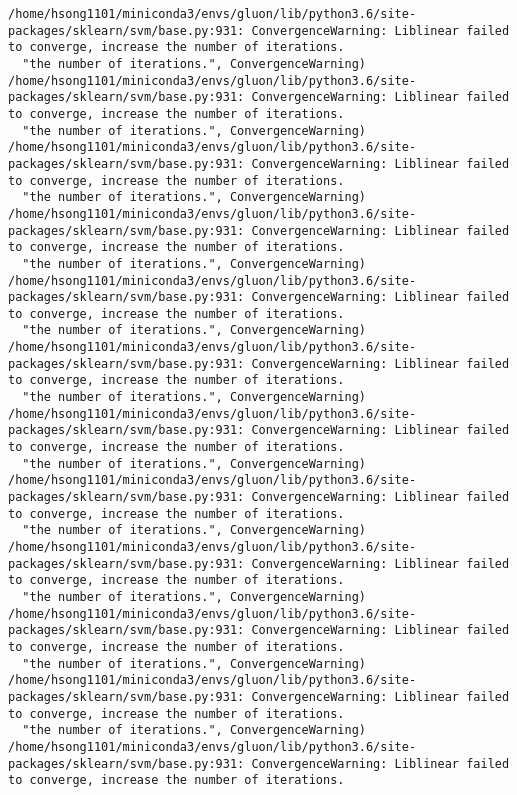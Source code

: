 \documentclass[11pt]{article}
\begin{document}
\begin{Verbatim}[commandchars=\\\{\}]
/home/hsong1101/miniconda3/envs/gluon/lib/python3.6/site-packages/sklearn/svm/base.py:931: ConvergenceWarning: Liblinear failed to converge, increase the number of iterations.
  "the number of iterations.", ConvergenceWarning)
/home/hsong1101/miniconda3/envs/gluon/lib/python3.6/site-packages/sklearn/svm/base.py:931: ConvergenceWarning: Liblinear failed to converge, increase the number of iterations.
  "the number of iterations.", ConvergenceWarning)
/home/hsong1101/miniconda3/envs/gluon/lib/python3.6/site-packages/sklearn/svm/base.py:931: ConvergenceWarning: Liblinear failed to converge, increase the number of iterations.
  "the number of iterations.", ConvergenceWarning)
/home/hsong1101/miniconda3/envs/gluon/lib/python3.6/site-packages/sklearn/svm/base.py:931: ConvergenceWarning: Liblinear failed to converge, increase the number of iterations.
  "the number of iterations.", ConvergenceWarning)
/home/hsong1101/miniconda3/envs/gluon/lib/python3.6/site-packages/sklearn/svm/base.py:931: ConvergenceWarning: Liblinear failed to converge, increase the number of iterations.
  "the number of iterations.", ConvergenceWarning)
/home/hsong1101/miniconda3/envs/gluon/lib/python3.6/site-packages/sklearn/svm/base.py:931: ConvergenceWarning: Liblinear failed to converge, increase the number of iterations.
  "the number of iterations.", ConvergenceWarning)
/home/hsong1101/miniconda3/envs/gluon/lib/python3.6/site-packages/sklearn/svm/base.py:931: ConvergenceWarning: Liblinear failed to converge, increase the number of iterations.
  "the number of iterations.", ConvergenceWarning)
/home/hsong1101/miniconda3/envs/gluon/lib/python3.6/site-packages/sklearn/svm/base.py:931: ConvergenceWarning: Liblinear failed to converge, increase the number of iterations.
  "the number of iterations.", ConvergenceWarning)
/home/hsong1101/miniconda3/envs/gluon/lib/python3.6/site-packages/sklearn/svm/base.py:931: ConvergenceWarning: Liblinear failed to converge, increase the number of iterations.
  "the number of iterations.", ConvergenceWarning)
/home/hsong1101/miniconda3/envs/gluon/lib/python3.6/site-packages/sklearn/svm/base.py:931: ConvergenceWarning: Liblinear failed to converge, increase the number of iterations.
  "the number of iterations.", ConvergenceWarning)
/home/hsong1101/miniconda3/envs/gluon/lib/python3.6/site-packages/sklearn/svm/base.py:931: ConvergenceWarning: Liblinear failed to converge, increase the number of iterations.
  "the number of iterations.", ConvergenceWarning)
/home/hsong1101/miniconda3/envs/gluon/lib/python3.6/site-packages/sklearn/svm/base.py:931: ConvergenceWarning: Liblinear failed to converge, increase the number of iterations.

\end{Verbatim}
\end{document}
